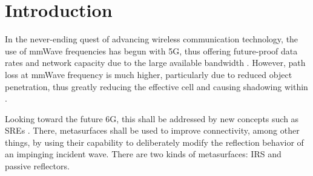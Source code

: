 \chapter{Introduction}
In the never-ending quest of advancing wireless communication technology, the use of \ac{mmWave} frequencies has begun with 5G, thus offering future-proof data rates and network capacity due to the large available bandwidth \cite{Intro1, ericsson6g, nokia6g}. However, path loss at \ac{mmWave} frequency is much higher, particularly due to reduced object penetration, thus greatly reducing the effective cell and causing shadowing within \cite{6GWireless, 8373698}. 

Looking toward the future 6G, this shall be addressed by new concepts such as \ac{SRE}s \cite{CNI}. There, metasurfaces shall be used to improve connectivity, among other things, by using their capability to deliberately modify the reflection behavior of an impinging incident wave. There are two kinds of metasurfaces: \ac{IRS} and passive reflectors.
